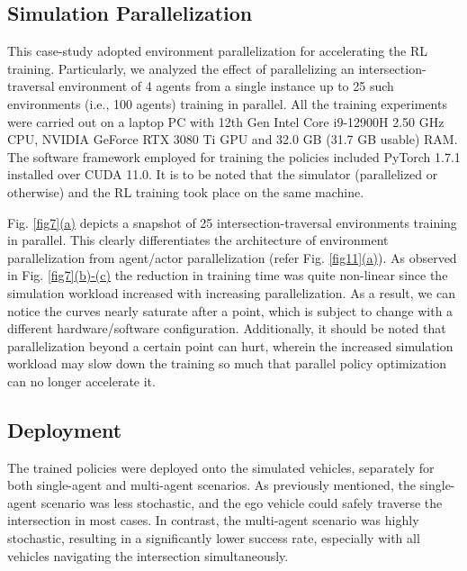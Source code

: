 \documentclass[letterpaper, 10 pt, conference]{ieeeconf}  %
\begin{document}
	\subsection{Simulation Parallelization}
	\label{Sub-Section: Simulation Parallelization I}
	
	This case-study adopted environment parallelization for accelerating the RL training. Particularly, we analyzed the effect of parallelizing an intersection-traversal environment of 4 agents from a single instance up to 25 such environments (i.e., 100 agents) training in parallel. All the training experiments were carried out on a laptop PC with 12th Gen Intel Core i9-12900H 2.50 GHz CPU, NVIDIA GeForce RTX 3080 Ti GPU and 32.0 GB (31.7 GB usable) RAM. The software framework employed for training the policies included PyTorch 1.7.1 installed over CUDA 11.0. It is to be noted that the simulator (parallelized or otherwise) and the RL training took place on the same machine.
	
	Fig. \hyperref[fig7]{\ref*{fig7}(a)} depicts a snapshot of 25 intersection-traversal environments training in parallel. This clearly differentiates the architecture of environment parallelization from agent/actor parallelization (refer Fig. \hyperref[fig11]{\ref*{fig11}(a)}). As observed in Fig. \hyperref[fig7]{\ref*{fig7}(b)-(c)} the reduction in training time was quite non-linear since the simulation workload increased with increasing parallelization. As a result, we can notice the curves nearly saturate after a point, which is subject to change with a different hardware/software configuration. Additionally, it should be noted that parallelization beyond a certain point can hurt, wherein the increased simulation workload may slow down the training so much that parallel policy optimization can no longer accelerate it.
	
	\subsection{Deployment}
	\label{Sub-Section: Deployment I}
	
	The trained policies were deployed onto the simulated vehicles, separately for both single-agent and multi-agent scenarios. As previously mentioned, the single-agent scenario was less stochastic, and the ego vehicle could safely traverse the intersection in most cases. In contrast, the multi-agent scenario was highly stochastic, resulting in a significantly lower success rate, especially with all vehicles navigating the intersection simultaneously.
	
\end{document}

